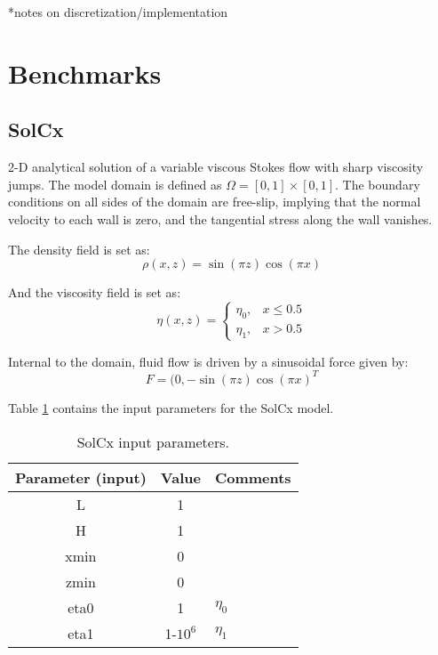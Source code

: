 \documentclass[a4paper,11pt]{article}
\begin{document}
*notes on discretization/implementation

\section{Benchmarks}

\subsection{SolCx \citep{Zhong1996, Moresi1996, Duretz2011}} \label{solcx}
2-D analytical solution of a variable viscous Stokes flow with sharp viscosity jumps. The model domain is defined as $\Omega = [0, 1] \times [0, 1]$. The boundary conditions on all sides of the domain are free-slip, implying that the normal velocity to each wall is zero, and the tangential stress along the wall vanishes. 

The density field is set as:
\begin{equation}
\rho(x,z) = \sin(\pi z) \cos(\pi x)
\end{equation}

And the viscosity field is set as:
\begin{equation}
\eta(x,z) = \left\{\begin{array}{lr}
    \eta_0, &  x \le 0.5\\
    \eta_1, & x > 0.5
  \end{array}\right.
\end{equation}

Internal to the domain, fluid flow is driven by a sinusoidal force given by:
\begin{equation}
F = (0,-\sin(\pi z) \cos(\pi x)^T
\end{equation}

Table \ref{tab:solcx} contains the input parameters for the SolCx model.

\begin{table}[h]
\begin{center}
\footnotesize
\begin{tabular}{c c l}
\hline 
Parameter (input)&Value&Comments\\
\hline
L&1&\\
H&1&\\
xmin&0&\\
zmin&0&\\
eta0&1&$\eta_0$\\
eta1&1-$10^6$&$\eta_1$\\
\hline  
\end{tabular}
\caption{SolCx input parameters.}
\label{tab:solcx}
\end{center}
\end{table}
\end{document}
